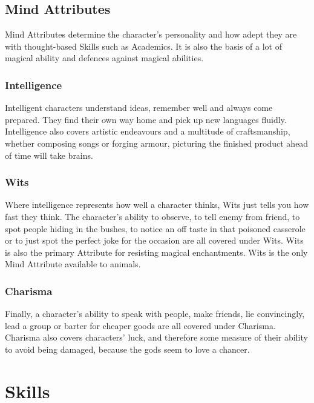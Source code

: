 \documentclass[titlepage,a4paper,openany]{book}
\begin{document}
\begin{multicols}{2}
\subsection{Mind Attributes}

Mind Attributes determine the character's personality and how adept they are with thought-based Skills such as Academics. It is also the basis of a lot of magical ability and defences against magical abilities.

\subsubsection{Intelligence}

Intelligent characters understand ideas, remember well and always come prepared. They find their own way home and pick up new languages fluidly. Intelligence also covers artistic endeavours and a multitude of craftsmanship, whether composing songs or forging armour, picturing the finished product ahead of time will take brains.

\subsubsection{Wits}

Where intelligence represents how well a character thinks, Wits just tells you how fast they think. The character's ability to observe, to tell enemy from friend, to spot people hiding in the bushes, to notice an off taste in that poisoned casserole or to just spot the perfect joke for the occasion are all covered under Wits. Wits is also the primary Attribute for resisting magical enchantments. Wits is the only Mind Attribute available to animals.

\subsubsection{Charisma}

Finally, a character's ability to speak with people, make friends, lie convincingly, lead a group or barter for cheaper goods are all covered under Charisma. Charisma also covers characters' luck, and therefore some measure of their ability to avoid being damaged, because the gods seem to love a chancer.

\end{multicols}

\section{Skills}
\end{document}
